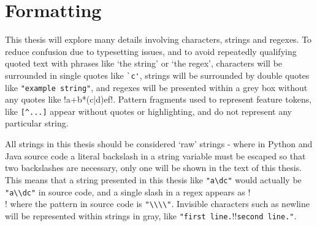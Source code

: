 \section{Formatting}
This thesis will explore many details involving characters, strings and regexes.  To reduce confusion due to typesetting issues, and to avoid repeatedly qualifying quoted text with phrases like `the string' or `the regex', characters will be surrounded in single quotes like \verb!`c'!, strings will be surrounded by double quotes like \verb!"example string"!, and regexes will be presented within a grey box without any quotes like \cverb!a+b*(c|d)e\1f!.  Pattern fragments used to represent feature tokens, like \verb![^...]! appear without quotes or highlighting, and do not represent any particular string.

All strings in this thesis should be considered `raw' strings - where in Python and Java source code a literal backslash in a string variable must be escaped so that two backslashes are necessary, only one will be shown in the text of this thesis.  This means that a string presented in this thesis like \verb!"a\dc"! would actually be \verb!"a\\dc"! in source code, and a single slash in a regex appears as \cverb!\\! where the pattern in source code is \verb!"\\\\"!.  Invisible characters such as newline will be represented within strings in gray, like \verb!"first line.!\gverb!\n!\verb!second line."!.

